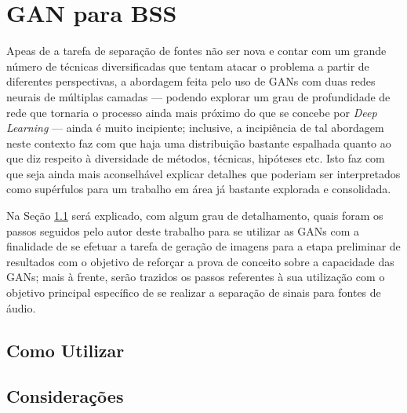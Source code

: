 \chapter{GAN para BSS}
\label{cha:gan_for_bss}

Apeas de a tarefa de separação de fontes não ser nova e contar com um grande número de técnicas diversificadas que tentam atacar o problema a partir de diferentes perspectivas, a abordagem feita pelo uso de GANs com duas redes neurais de múltiplas camadas --- podendo explorar um grau de profundidade de rede que tornaria o processo ainda mais próximo do que se concebe por \textit{Deep Learning} --- ainda é muito incipiente; inclusive, a incipiência de tal abordagem neste contexto faz com que haja uma distribuição bastante espalhada quanto ao que diz respeito à diversidade de métodos, técnicas, hipóteses etc. Isto faz com que seja ainda mais aconselhável explicar detalhes que poderiam ser interpretados como supérfulos para um trabalho em área já bastante explorada e consolidada.

Na Seção \ref{sec:gan_for_bss_how_to_use} será explicado, com algum grau de detalhamento, quais foram os passos seguidos pelo autor deste trabalho para se utilizar as GANs com a finalidade de se efetuar a tarefa de geração de imagens para a etapa preliminar de resultados com o objetivo de reforçar a prova de conceito sobre a capacidade das GANs; mais à frente, serão trazidos os passos referentes à sua utilização com o objetivo principal específico de se realizar a separação de sinais para fontes de áudio.



\section{Como Utilizar}
\label{sec:gan_for_bss_how_to_use}



\section{Considerações}
\label{sec:sec:gan_for_bss_considerations}



